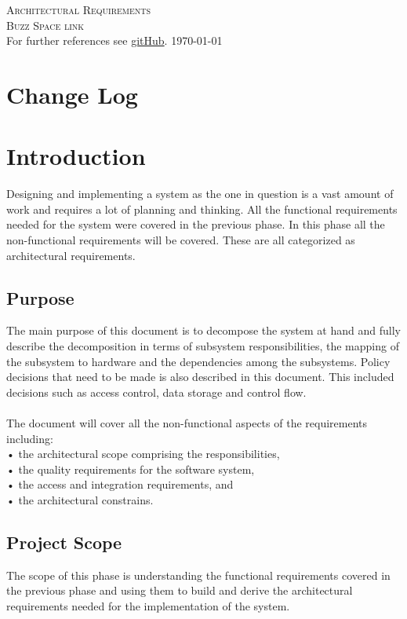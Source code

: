 \documentclass[a4paper,12pt]{report}
\begin{document}
\renewcommand{\thesection}{\arabic{section}}
\newpage
\begin{center}
\textsc{\LARGE Architectural Requirements}\\[1.5cm]
\textsc{\Large Buzz Space link}\\[0.5cm]
For further references see \href{https://github.com/COS301-Group-3-A-Phase2/Part2-Mini-Project.git}{gitHub}.
\today
\end{center}
\tableofcontents{}

\newpage


\section{Change Log}


\section{Introduction}
Designing and implementing a system as the one in question is a vast amount of work and requires a lot of planning and thinking. All the functional requirements needed for the system were covered in the previous phase. In this phase all the non-functional requirements will be covered. These are all categorized as architectural requirements.  \\
\subsection{Purpose}
The main purpose of this document is to decompose the system at hand and fully describe the decomposition in terms of subsystem responsibilities, the mapping of the subsystem to hardware and the dependencies among the subsystems. Policy decisions that need to be made is also described in this document. This included decisions such as access control, data storage and control flow.\\\\
The document will cover all the non-functional aspects of the requirements including:\\
•	the architectural scope comprising the responsibilities,\\
•	the quality requirements for the software system,\\
•	the access and integration requirements, and\\
•	the architectural constrains. \\

\subsection{Project Scope}
The scope of this phase is understanding the functional requirements covered in the previous phase and using them to build and derive the architectural requirements needed for the implementation of the system.\\
\end{document}
